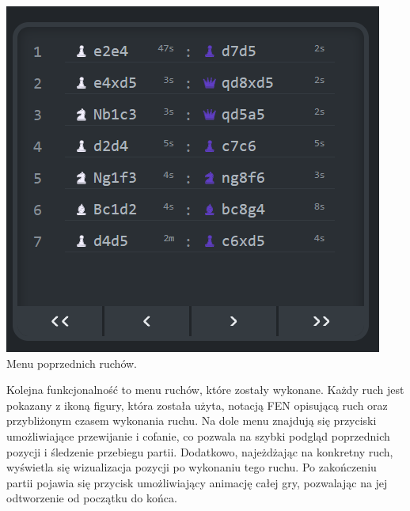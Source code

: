 \documentclass[12pt,a4paper]{article}
\begin{document}
\begin{minipage}[t]{0.45\textwidth} 
    \vspace{0pt} 
    \centering 
    \includegraphics[width=\linewidth]{images/ins_min_moves.png} 
    Menu poprzednich ruchów.
\end{minipage} 
\hfill 
\begin{minipage}[t]{0.45\textwidth} 
    \vspace{0pt} 
    \justifying 
    \noindent 
    Kolejna funkcjonalność to menu ruchów, które zostały wykonane. Każdy ruch jest pokazany z ikoną figury, która została użyta, notacją FEN opisującą ruch oraz przybliżonym czasem wykonania ruchu. Na dole menu znajdują się przyciski umożliwiające przewijanie i cofanie, co pozwala na szybki podgląd poprzednich pozycji i śledzenie przebiegu partii. Dodatkowo, najeżdżając na konkretny ruch, wyświetla się wizualizacja pozycji po wykonaniu tego ruchu. Po zakończeniu partii pojawia się przycisk umożliwiający animację całej gry, pozwalając na jej odtworzenie od początku do końca.
\end{minipage}

\vspace{1cm}
\end{document}
